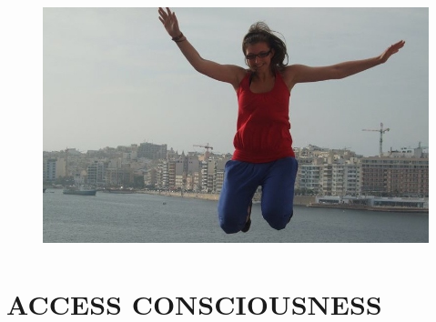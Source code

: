 \documentclass[foldmark,10pt,a4paper,notumble]{leaflet}
\begin{document}

\vspace*{20mm}
\begin{figure}[h!]
\includegraphics [scale=.489, angle=270 ]{Bild3.jpg}
\end{figure}




\section{ACCESS CONSCIOUSNESS \textsuperscript{\textregistered}}
\end{document}
